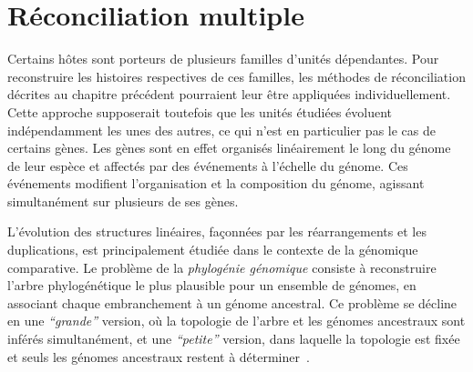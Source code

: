 \chapter{Réconciliation multiple}

Certains hôtes sont porteurs de plusieurs familles d’unités dépendantes.
Pour reconstruire les histoires respectives de ces familles, les méthodes de réconciliation décrites au chapitre précédent pourraient leur être appliquées individuellement.
Cette approche supposerait toutefois que les unités étudiées évoluent indépendamment les unes des autres, ce qui n’est en particulier pas le cas de certains gènes.
Les gènes sont en effet organisés linéairement le long du génome de leur espèce et affectés par des événements à l’échelle du génome.
Ces événements modifient l’organisation et la composition du génome, agissant simultanément sur plusieurs de ses gènes.

L’évolution des structures linéaires, façonnées par les réarrangements et les duplications, est principalement étudiée dans le contexte de la génomique comparative.
Le problème de la \emph{phylogénie génomique} consiste à reconstruire l’arbre phylogénétique le plus plausible pour un ensemble de génomes, en associant chaque embranchement à un génome ancestral.
Ce problème se décline en une \emph{\enquote{grande}} version, où la topologie de l’arbre et les génomes ancestraux sont inférés simultanément, et une \emph{\enquote{petite}} version, dans laquelle la topologie est fixée et seuls les génomes ancestraux restent à déterminer~\parencite[pour une revue de ces problèmes, voir][]{ElMabrouk2012AnalysisGeneOrder}.


